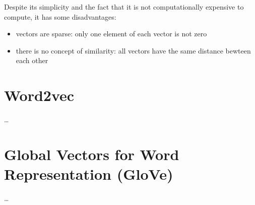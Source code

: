 Despite its simplicity and the fact that it is not computationally expensive to compute, it has some disadvantages:
\begin{itemize}
    \item vectors are sparse: only one element of each vector is not zero
    \item there is no concept of similarity: all vectors have the same distance bewteen each other
\end{itemize}

\section{Word2vec}
\dots

\section{Global Vectors for Word Representation (GloVe)}
\dots
